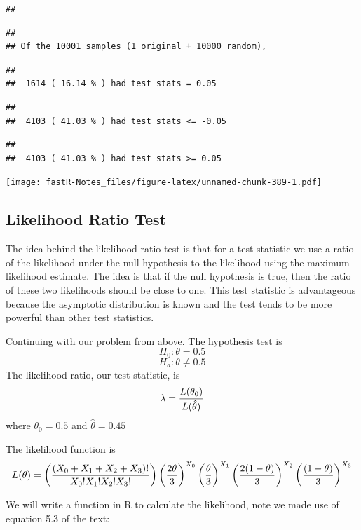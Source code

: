 \documentclass[]{book}
\theoremstyle{definition}
\theoremstyle{definition}
\theoremstyle{definition}
\theoremstyle{remark}
\begin{document}
\begin{verbatim}
## 
\end{verbatim}

\begin{verbatim}
## 
## Of the 10001 samples (1 original + 10000 random),
\end{verbatim}

\begin{verbatim}
## 
##  1614 ( 16.14 % ) had test stats = 0.05
\end{verbatim}

\begin{verbatim}
## 
##  4103 ( 41.03 % ) had test stats <= -0.05
\end{verbatim}

\begin{verbatim}
## 
##  4103 ( 41.03 % ) had test stats >= 0.05
\end{verbatim}

\texttt{[image: fastR-Notes\_files/figure-latex/unnamed-chunk-389-1.pdf]}

\subsection{Likelihood Ratio Test}\label{likelihood-ratio-test}

The idea behind the likelihood ratio test is that for a test statistic
we use a ratio of the likelihood under the null hypothesis to the
likelihood using the maximum likelihood estimate. The idea is that if
the null hypothesis is true, then the ratio of these two likelihoods
should be close to one. This test statistic is advantageous because the
asymptotic distribution is known and the test tends to be more powerful
than other test statistics.

Continuing with our problem from above. The hypothesis test is
\[H_{0}: \theta = 0.5\] \[H_{a}: \theta \neq 0.5\] The likelihood ratio,
our test statistic, is \[\lambda={L(\theta_{0}) \over L(\hat{\theta})}\]
where \(\theta_{0}=0.5\) and \(\hat{\theta}=0.45\)

The likelihood function is
\[L(\theta)= \left( {\left(X_{0}+X_{1}+X_{2}+X_{3} \right)! \over X_{0}!X_{1}!X_{2}!X_{3}!} \right) \left( {2 \theta \over 3} \right)^{X_{0}}\left( { \theta \over 3} \right)^{X_{1}}\left( {2 (1- \theta) \over 3} \right)^{X_{2}}\left( {(1 - \theta ) \over 3} \right)^{X_{3}}\]

We will write a function in R to calculate the likelihood, note we made
use of equation 5.3 of the text:
\end{document}
